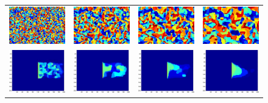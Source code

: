 \begin{figure}
\centering
\begin{tabular}{cccc}
\includegraphics[height=.75in, trim={.7cm 0 .7cm 0},clip]{../Speedup/Parallel_Bits/iso-01}&
\includegraphics[height=.75in, trim={.7cm 0 .7cm 0},clip]{../Speedup/Parallel_Bits/iso-02}&
\includegraphics[height=.75in, trim={.7cm 0 .7cm 0},clip]{../Speedup/Parallel_Bits/iso-03}&
\includegraphics[height=.75in, trim={.7cm 0 .7cm 0},clip]{../Speedup/Parallel_Bits/iso-04}\\
\includegraphics[height=.75in, trim={.7cm .6cm .7cm .6cm}, clip]{../Speedup/Parallel_Bits/par025}&
\includegraphics[height=.75in, trim={.7cm .6cm .7cm .6cm}, clip]{../Speedup/Parallel_Bits/par100}&
\includegraphics[height=.75in, trim={.7cm .6cm .7cm .6cm}, clip]{../Speedup/Parallel_Bits/par225}&
\includegraphics[height=.75in, trim={.7cm .6cm .7cm .6cm}, clip]{../Speedup/Parallel_Bits/par400}

\end{tabular}
\end{figure}
